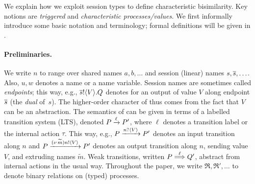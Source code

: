 

We explain how we exploit session types to 
define characteristic bisimilarity.
Key notions are \emph{triggered} and \emph{characteristic processes/values}.
We first informally introduce some basic notation and terminology; formal definitions will be given in .


\paragraph{Preliminaries.}
We write $n$ to range over shared names $a,b,\ldots$ and session (linear) names $s, \overline{s}, \ldots$.
Also, $u, w$ denotes a name or a name variable.
Session names are sometimes called \emph{endpoints}; this way, e.g., 
$\overline{s} ! \langle V \rangle . Q$ denotes 
for an output of value $V$ along endpoint $\overline{s}$ (the \emph{dual} of~$s$).
The higher-order character of \HOp thus comes from the fact that $V$ can be an abstraction.
The semantics of \HOp can be given in terms of a labelled transition system (LTS),
denoted $P \xrightarrow{\ell} P'$, where $\ell$ denotes a transition label or the internal action $\tau$.
This way, e.g., 
$P \xrightarrow{n ? \langle V \rangle} P'$ denotes an input transition along $n$
and
$P \xrightarrow{(\nu\, \widetilde{m}) n ! \langle V \rangle} P'$
denotes an output transition along $n$, 
sending value $V$, and extruding names $\widetilde{m}$. 
Weak transitions, written 
$P \stackrel{\ell}{\Longrightarrow} Q'$, abstract from internal actions in the usual way.
Throughout the paper, we write $\Re, \Re',\ldots$ to denote binary relations on (typed) processes.

